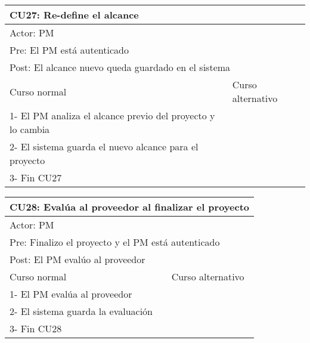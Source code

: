 \begin{table}[H]
  \begin{adjustbox}{max width = \textwidth}
  \begin{tabular}{|l|l|}
    \hline
    \multicolumn{2}{|l|}{CU27: Re-define el alcance} \\\hline
    \multicolumn{2}{|l|}{Actor: PM} \\\hline
    \multicolumn{2}{|l|}{Pre:  El PM está autenticado} \\\hline
    \multicolumn{2}{|l|}{Post: El alcance nuevo queda guardado en el sistema} \\\hline
     Curso normal & Curso alternativo\\ \hline
     1- El PM analiza el alcance previo del proyecto y lo cambia & \\ \hline
  	 2- El sistema guarda el nuevo alcance para el proyecto & \\ \hline
     3- Fin CU27 & \\ \hline
 \end{tabular}
  \end{adjustbox}
\end{table}

\begin{table}[H]
  \begin{adjustbox}{max width = \textwidth}
  \begin{tabular}{|l|l|}
    \hline
    \multicolumn{2}{|l|}{CU28: Evalúa al proveedor al finalizar el proyecto} \\\hline
    \multicolumn{2}{|l|}{Actor: PM} \\\hline
    \multicolumn{2}{|l|}{Pre: Finalizo el proyecto y el PM está autenticado} \\\hline
    \multicolumn{2}{|l|}{Post: El PM evalúo al proveedor} \\\hline
     Curso normal & Curso alternativo\\ \hline
	 1- El PM evalúa al proveedor & \\ \hline
	 2- El sistema guarda la evaluación & \\ \hline
   3- Fin CU28 & \\ \hline
  \end{tabular}
  \end{adjustbox}
\end{table}

